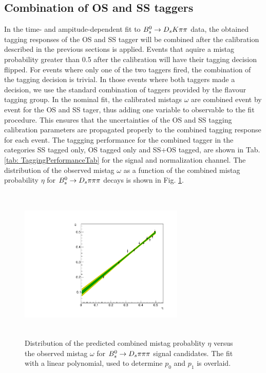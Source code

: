 \subsection{Combination of OS and SS taggers}
\label{subsec: TaggingCombination}

In the time- and ampitude-dependent fit to ${{B}^0_{s}}\rightarrow{\ensuremath{{D}_{s}}}{\ensuremath{K}}{\ensuremath{\pi}}{\ensuremath{\pi}}$ data, the obtained tagging responses of the OS and SS tagger will be combined after the calibration described in the previous sections is applied.
Events that aquire a mistag probability greater than 0.5 after the calibration will have their tagging decision flipped. For events where only one of the two taggers fired, the combination of the tagging decision is trivial.
In those events where both taggers made a decision, we use the standard combination of taggers \cite{LHCb-PAPER-2011-027} provided by the flavour tagging group. 
In the nominal fit, the calibrated mistags $\omega$ are combined event by event for the OS and SS tager, thus adding one variable to observable to the fit procedure. 
This ensures that the uncertainties of the OS and SS tagging calibration parameters are propagated properly to the combined tagging response for each event. \newline
The taggging performance for the combined tagger in the categories SS tagged only, OS tagged only and SS+OS tagged, are shown in Tab. \ref{tab: TaggingPerformanceTab} for the signal and normalization channel.
The distribution of the observed mistag $\omega$ as a function of the combined mistag probability $\eta$ for ${{B}^0_{s}}\rightarrow{\ensuremath{{D}_{s}}}{\ensuremath{\pi}}{\ensuremath{\pi}}{\ensuremath{\pi}}$ decays is shown in Fig. \ref{fig:TaggingCombinationCalibration}.


\begin{figure}[h]
\centering
\includegraphics[height=7.4cm,width=0.7\textwidth]{figs/Tagging/TaggingCombinationCalibration.pdf}
\caption{Distribution of the predicted combined mistag probablity $\eta$ versus the observed mistag $\omega$ for ${{B}^0_{s}}\rightarrow{\ensuremath{{D}_{s}}}{\ensuremath{\pi}}{\ensuremath{\pi}}{\ensuremath{\pi}}$ signal candidates. 
The fit with a linear polynomial, used to determine $p_{0}$ and $p_{1}$ is overlaid.}
\label{fig:TaggingCombinationCalibration}
\end{figure}

